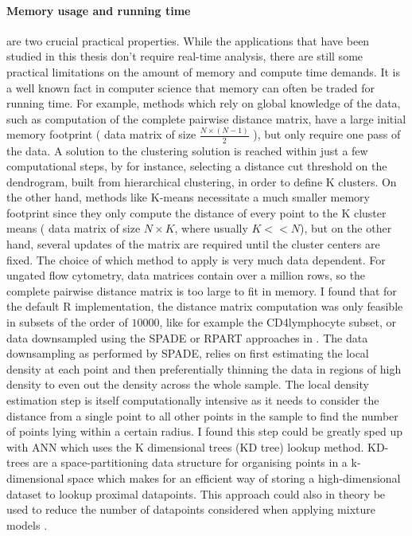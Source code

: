 \paragraph{Memory usage and running time} are two crucial practical properties.
While the applications that have been studied in this thesis don’t require real-time analysis, there are still some practical limitations on the amount of memory and compute time demands.
It is a well known fact in computer science that memory can often be traded for running time.
For example, methods which rely on global knowledge of the data, such as computation of the complete pairwise distance matrix,
have a large initial memory footprint ( data matrix of size $\frac{N \times (N-1)}{2}$ ), but only require one pass of the data.
A solution to the clustering solution is reached within just a few computational steps, by for instance,
selecting a distance cut threshold on the dendrogram, built from hierarchical clustering, in order to define K clusters. 
On the other hand, methods like K-means necessitate a much smaller memory footprint since they only compute the distance of every point to the K cluster means ( data matrix of size $N \times K$, where usually $K << N$), but on the other hand, several updates of the matrix are required until the cluster centers are fixed.
The choice of which method to apply is very much data dependent.
For ungated flow cytometry, data matrices  contain over a million rows, so the complete pairwise distance matrix is too large to fit in memory.
I found that for the default R implementation, the distance matrix computation was only feasible in subsets of the order of $10000$, like for example the CD4\positive lymphocyte subset, or data downsampled using the SPADE or RPART approaches in .
The data downsampling as performed by SPADE, relies on first estimating the local density at each point and then preferentially thinning the data in regions of high density to even out the density across the whole sample.
The local density estimation step is itself computationally intensive as it needs to consider the distance from a single point to all other points in the sample to find the number of points lying within a certain radius.
I found this step could be greatly sped up with \gls{ANN} which uses the K dimensional trees (KD tree) lookup method.
KD-trees are a space-partitioning data structure for organising points in a k-dimensional space which makes for an efficient
way of storing a high-dimensional dataset to lookup proximal datapoints.
This approach could also in theory be used to reduce the number of datapoints considered when applying mixture models \citep{McLachlan:2004uw}.

